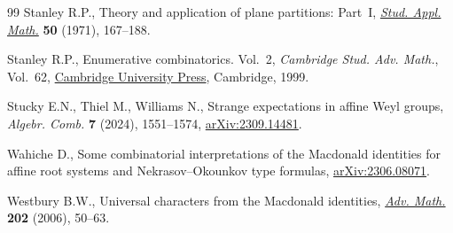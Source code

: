 \begin{thebibliography}{99}
Stanley R.P., Theory and application of plane partitions: {P}art~{I},
 \href{https://doi.org/10.1002/sapm1971502167}{\textit{Stud. Appl. Math.}} \textbf{50} (1971), 167--188.

Stanley R.P., Enumerative combinatorics. {V}ol.~2, \textit{Cambridge Stud. Adv.
 Math.}, Vol.~62, \href{https://doi.org/10.1017/CBO9780511609589}{Cambridge University Press}, Cambridge, 1999.

Stucky E.N., Thiel M., Williams N., Strange expectations in affine {W}eyl
 groups, \textit{Algebr. Comb.} \textbf{7} (2024), 1551--1574,
 \href{https://arxiv.org/abs/2309.14481}{arXiv:2309.14481}.

Wahiche D., Some combinatorial interpretations of the Macdonald identities for
 affine root systems and Nekrasov--Okounkov type formulas,
 \href{https://arxiv.org/abs/2306.08071}{arXiv:2306.08071}.

Westbury B.W., Universal characters from the {M}acdonald identities,
 \href{https://doi.org/10.1016/j.aim.2005.03.013}{\textit{Adv. Math.}} \textbf{202} (2006), 50--63.

\end{thebibliography}

